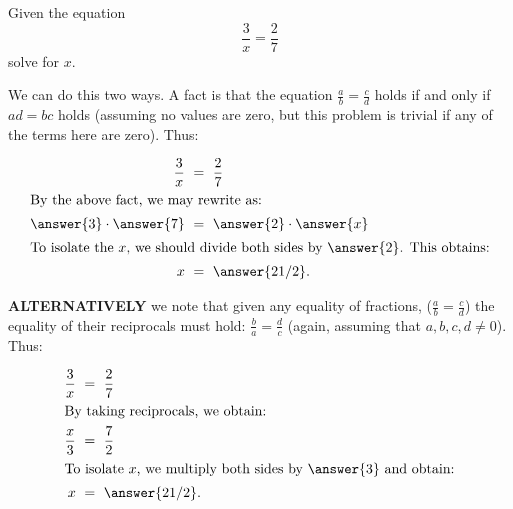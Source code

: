 \documentclass{ximera}
\begin{document}
\begin{question}
Given the equation $$\frac{3}{x}=\frac{2}{7}$$ solve for $x$.

We can do this two ways.  A fact is that the equation $\frac{a}{b}=\frac{c}{d}$ holds if and only if $ad=bc$ holds (assuming no values are zero, but this problem is trivial if any of the terms here are zero).  Thus:

\begin{align*}
\frac{3}{x}&\ =\ \frac{2}{7}\\
\intertext{By the above fact, we may rewrite as:}
\answer{3}\cdot\answer{7}&\ =\ \answer{2}\cdot\answer{x}\\
\intertext{To isolate the $x$, we should divide both sides by $\answer{2}$.  This obtains:}
x&\ = \ \answer{21/2}.
\end{align*}

\textbf{ALTERNATIVELY} we note that given any equality of fractions, ($\frac{a}{b}=\frac{c}{d}$) the equality of their reciprocals must hold: $\frac{b}{a}=\frac{d}{c}$ (again, assuming that $a,b,c,d\neq0$).  Thus:

\begin{align*}
\frac{3}{x}&\ =\ \frac{2}{7}\\
\intertext{By taking reciprocals, we obtain:}
\frac{x}{3}&\ =\ \frac{7}{2}\\
\intertext{To isolate $x$, we multiply both sides by $\answer{3}$ and obtain:}
x&\ =\ \answer{21/2}.
\end{align*}


\end{question}
\end{document}
